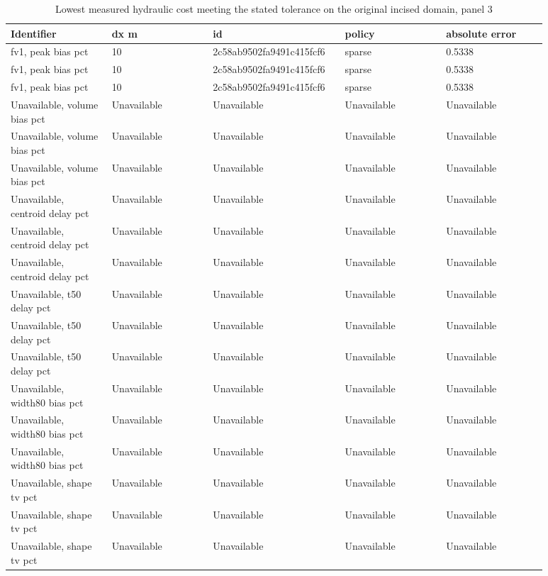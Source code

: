 \begin{longtable}{p{0.1760\linewidth}p{0.1760\linewidth}p{0.1760\linewidth}p{0.1760\linewidth}p{0.1760\linewidth}}
\caption{Lowest measured hydraulic cost meeting the stated tolerance on the original incised domain, panel 3}\\
\hline
Identifier & dx m & id & policy & absolute error \\
\hline\endhead
fv1, peak bias pct & 10 & 2c58ab9502fa9491c415fcf6 & sparse & 0.5338 \\
fv1, peak bias pct & 10 & 2c58ab9502fa9491c415fcf6 & sparse & 0.5338 \\
fv1, peak bias pct & 10 & 2c58ab9502fa9491c415fcf6 & sparse & 0.5338 \\
Unavailable, volume bias pct & Unavailable & Unavailable & Unavailable & Unavailable \\
Unavailable, volume bias pct & Unavailable & Unavailable & Unavailable & Unavailable \\
Unavailable, volume bias pct & Unavailable & Unavailable & Unavailable & Unavailable \\
Unavailable, centroid delay pct & Unavailable & Unavailable & Unavailable & Unavailable \\
Unavailable, centroid delay pct & Unavailable & Unavailable & Unavailable & Unavailable \\
Unavailable, centroid delay pct & Unavailable & Unavailable & Unavailable & Unavailable \\
Unavailable, t50 delay pct & Unavailable & Unavailable & Unavailable & Unavailable \\
Unavailable, t50 delay pct & Unavailable & Unavailable & Unavailable & Unavailable \\
Unavailable, t50 delay pct & Unavailable & Unavailable & Unavailable & Unavailable \\
Unavailable, width80 bias pct & Unavailable & Unavailable & Unavailable & Unavailable \\
Unavailable, width80 bias pct & Unavailable & Unavailable & Unavailable & Unavailable \\
Unavailable, width80 bias pct & Unavailable & Unavailable & Unavailable & Unavailable \\
Unavailable, shape tv pct & Unavailable & Unavailable & Unavailable & Unavailable \\
Unavailable, shape tv pct & Unavailable & Unavailable & Unavailable & Unavailable \\
Unavailable, shape tv pct & Unavailable & Unavailable & Unavailable & Unavailable \\

\end{longtable}
